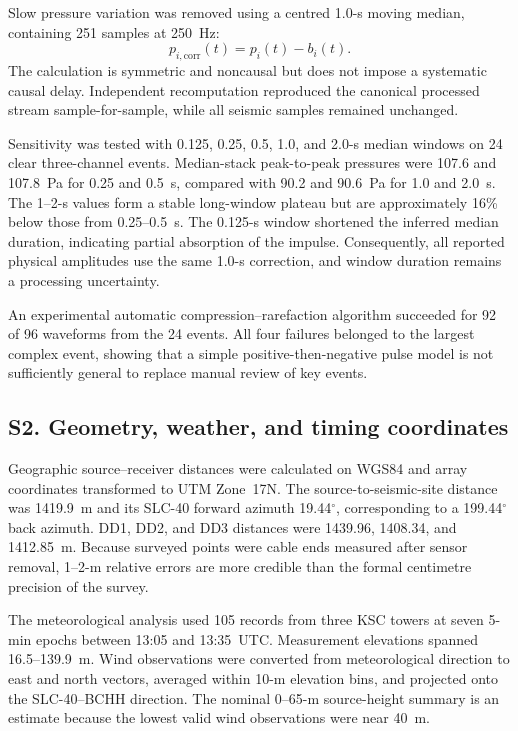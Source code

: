 \documentclass[]{seismica}
\begin{document}
Slow pressure variation was removed using a centred 1.0-s moving median,
containing 251 samples at 250~Hz:
\begin{equation}
 p_{i,\mathrm{corr}}(t)=p_i(t)-b_i(t).
\end{equation}
The calculation is symmetric and noncausal but does not impose a systematic
causal delay. Independent recomputation reproduced the canonical processed
stream sample-for-sample, while all seismic samples remained unchanged.

Sensitivity was tested with 0.125, 0.25, 0.5, 1.0, and 2.0-s median windows on
24 clear three-channel events. Median-stack peak-to-peak pressures were 107.6
and 107.8~Pa for 0.25 and 0.5~s, compared with 90.2 and 90.6~Pa for 1.0 and
2.0~s. The 1--2-s values form a stable long-window plateau but are
approximately 16\% below those from 0.25--0.5~s. The 0.125-s window shortened
the inferred median duration, indicating partial absorption of the impulse.
Consequently, all reported physical amplitudes use the same 1.0-s correction,
and window duration remains a processing uncertainty.

An experimental automatic compression--rarefaction algorithm succeeded for
92 of 96 waveforms from the 24 events. All four failures belonged to the
largest complex event, showing that a simple positive-then-negative pulse model
is not sufficiently general to replace manual review of key events.

\FloatBarrier
\subsection{S2. Geometry, weather, and timing coordinates}
\label{sec:supp_weather}

Geographic source--receiver distances were calculated on WGS84 and array
coordinates transformed to UTM Zone~17N. The source-to-seismic-site distance
was 1419.9~m and its SLC-40 forward azimuth 19.44$^\circ$, corresponding to a
199.44$^\circ$ back azimuth. DD1, DD2, and DD3 distances were 1439.96,
1408.34, and 1412.85~m. Because surveyed points were cable ends measured after
sensor removal, 1--2-m relative errors are more credible than the formal
centimetre precision of the survey.

The meteorological analysis used 105 records from three KSC towers at seven
5-min epochs between 13:05 and 13:35~UTC. Measurement elevations spanned
16.5--139.9~m. Wind observations were converted from meteorological direction
to east and north vectors, averaged within 10-m elevation bins, and projected
onto the SLC-40--BCHH direction. The nominal 0--65-m source-height summary is
an estimate because the lowest valid wind observations were near 40~m.
\end{document}
